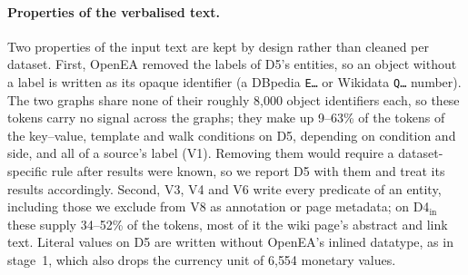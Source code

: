 
\paragraph{Properties of the verbalised text.}
Two properties of the input text are kept by design rather than cleaned
per dataset. First, OpenEA removed the labels of D5's entities, so an object
without a label is written as its opaque identifier (a DBpedia
\texttt{E\ldots} or Wikidata \texttt{Q\ldots} number). The two graphs share
none of their roughly 8{,}000 object identifiers each, so these tokens carry
no signal across the graphs; they make up 9--63\% of the tokens of the
key--value, template and walk conditions on D5, depending on condition and
side, and all of a source's label (V1). Removing them would require a
dataset-specific rule after results were known, so we report D5 with them
and treat its results accordingly. Second, V3, V4 and V6 write every
predicate of an entity, including those we exclude from V8 as annotation or
page metadata; on D4$_{\mathrm{in}}$ these supply 34--52\% of the tokens,
most of it the wiki page's abstract and link text. Literal values on D5 are
written without OpenEA's inlined datatype, as in stage~1, which also drops
the currency unit of 6{,}554 monetary values.
